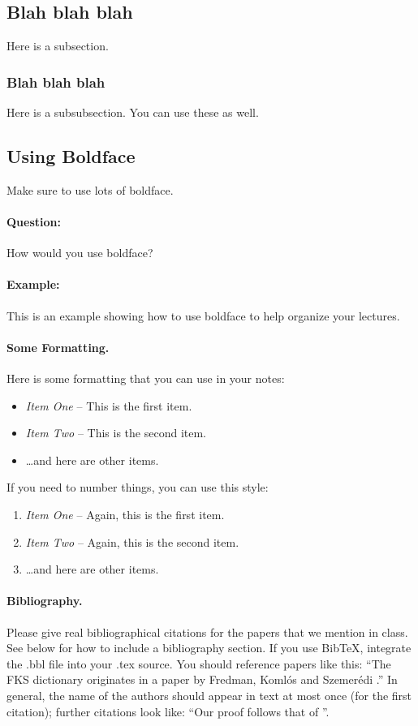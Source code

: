 \documentclass[11pt]{article}
\begin{document}
\subsection{Blah blah blah}
Here is a subsection.

\subsubsection{Blah blah blah}
Here is a subsubsection. You can use these as well.

\subsection{Using Boldface}
Make sure to use lots of boldface.

\paragraph{Question:}
How would you use boldface?

\paragraph{Example:}
This is an example showing how to use boldface to 
help organize your lectures.


\paragraph{Some Formatting.}
Here is some formatting that you can use in your notes:
\begin{itemize}
\item {\em Item One} -- This is the first item.
\item {\em Item Two} -- This is the second item.
\item \dots and here are other items.
\end{itemize}

If you need to number things, you can use this style:
\begin{enumerate}
\item {\em Item One} -- Again, this is the first item.
\item {\em Item Two} -- Again, this is the second item.
\item \dots and here are other items.
\end{enumerate}

\paragraph{Bibliography.}
Please give real bibliographical citations for the papers that we
mention in class. See below for how to include a bibliography section.
If you use BibTeX, integrate the .bbl file into your .tex
source. You should reference papers like this: ``The FKS
dictionary originates in a paper by Fredman, Koml\'{o}s and
Szemer\'{e}di \cite{fks}.'' In general, the name of the authors should
appear in text at most once (for the first citation); further
citations look like: ``Our proof follows that of \cite{fks}''.
\end{document}

